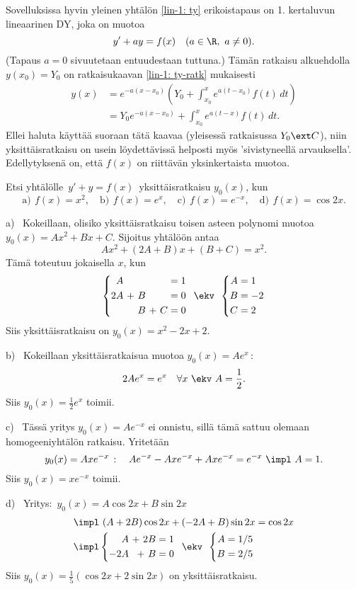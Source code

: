 Sovelluksissa hyvin yleinen yhtälön \eqref{lin-1: ty} erikoistapaus on 
1. kertaluvun lineaarinen DY, joka on muotoa
\begin{equation} \label{lin-1: ty-vak}
y'+ay=f(x)\quad (a\in\R,\ a \neq 0).
\end{equation}
(Tapaus $a=0$ sivuutetaan entuudestaan tuttuna.) Tämän ratkaisu alkuehdolla $y(x_0)=Y_0$ on 
ratkaisukaavan \eqref{lin-1: ty-ratk} mukaisesti
\begin{align*}
y(x) &= e^{-a(x-x_0)}\left(Y_0+\int_{x_0}^x e^{a(t-x_0)}f(t)\,dt\right) \\
     &= Y_0e^{-a(x-x_0)} + \int_{x_0}^x e^{a(t-x)}f(t)\,dt.
\end{align*}
Ellei haluta käyttää suoraan tätä kaavaa (yleisessä ratkaisussa $Y_0 \ext C$), niin 
yksittäisratkaisu on usein löydettävissä helposti myös 'sivistyneellä arvauksella'. 
Edellytyksenä on, että $f(x)$ on riittävän yksinkertaista muotoa.
\begin{Exa}
Etsi yhtälölle $\,y'+y=f(x)\,$ yksittäisratkaisu $y_0(x)$, kun
\[
\text{a)}\,\ f(x)=x^2, \quad 
\text{b)}\,\ f(x)=e^x, \quad 
\text{c)}\,\ f(x)=e^{-x}, \quad 
\text{d)}\,\ f(x)=\cos 2x.
\]
\end{Exa}
\ratk a) \ Kokeillaan, olisiko yksittäisratkaisu toisen asteen polynomi muotoa
$y_0(x)=Ax^2+Bx+C$. Sijoitus yhtälöön antaa
\[
Ax^2+(2A+B)x+(B+C)=x^2.
\]
Tämä toteutuu jokaisella $x$, kun
\[
\left\{ \begin{alignedat}{4}
&A & & & & & &=1 \\
2&A & \ + \ &B & & & &=0 \\
& & &B & \ + \ &C & &=0
\end{alignedat} \right. \,\ \ekv \,\
\left\{ \begin{aligned}
A &= 1 \\
B &= -2 \\
C &= 2
\end{aligned} \right.
\]
Siis yksittäisratkaisu on $y_0(x)=x^2-2x+2$.

\ratk b) \ Kokeillaan yksittäisratkaisua muotoa $y_0(x)=Ae^x\,$:
\[
2Ae^x=e^x\quad\forall x \ \ekv \ A=\frac{1}{2}.
\]
Siis $y_0(x)=\tfrac{1}{2}e^x$ toimii.

\ratk c) \ Tässä yritys $y_0(x)=Ae^{-x}$ ei onnistu, sillä tämä sattuu olemaan homogeeniyhtälön
ratkaisu. Yritetään
\[
y_0(x)=Axe^{-x}\,:\quad Ae^{-x}-Axe^{-x}+Axe^{-x}=e^{-x}\ \impl\ A=1.
\]
Siis $y_0(x)=xe^{-x}$ toimii.

\ratk d) \ Yritys: $\,y_0(x)=A\cos 2x + B\sin 2x$
\begin{align*}
&\impl \ (A+2B)\cos 2x + (-2A+B)\sin 2x=\cos 2x \\
&\impl \left\{ \begin{alignedat}{3}
&A & \ + \ 2&B & &=1 \\
-2&A & \ + \ &B & &=0
\end{alignedat} \right. \,\ \ekv \,\ \left\{ \begin{aligned}
A &= 1/5 \\
B &= 2/5
\end{aligned} \right.
\end{align*}
Siis $y_0(x)=\tfrac{1}{5}(\cos 2x+2\sin 2x)$ on yksittäisratkaisu. \loppu \newline

